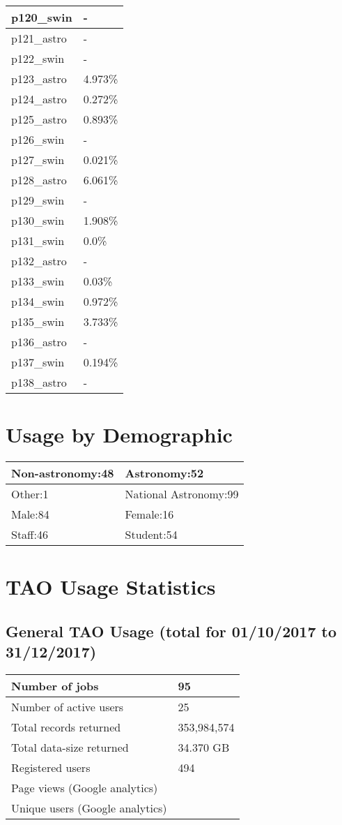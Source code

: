 \documentclass{article}%
\begin{document}
\begin{longtabu}{X[l] X[r]}
\hline%
p120\_swin&{-}\\%
\hline%
p121\_astro&{-}\\%
\hline%
p122\_swin&{-}\\%
\hline%
p123\_astro&4.973\%\\%
\hline%
p124\_astro&0.272\%\\%
\hline%
p125\_astro&0.893\%\\%
\hline%
p126\_swin&{-}\\%
\hline%
p127\_swin&0.021\%\\%
\hline%
p128\_astro&6.061\%\\%
\hline%
p129\_swin&{-}\\%
\hline%
p130\_swin&1.908\%\\%
\hline%
p131\_swin&0.0\%\\%
\hline%
p132\_astro&{-}\\%
\hline%
p133\_swin&0.03\%\\%
\hline%
p134\_swin&0.972\%\\%
\hline%
p135\_swin&3.733\%\\%
\hline%
p136\_astro&{-}\\%
\hline%
p137\_swin&0.194\%\\%
\hline%
p138\_astro&{-}\\%
\hline%
\end{longtabu}%
\section{Usage by Demographic}%

%
\begin{longtabu}{X[l] X[l]}%
Non{-}astronomy:48&Astronomy:52\\%
\hline%
Other:1&National Astronomy:99\\%
\hline%
Male:84&Female:16\\%
\hline%
Staff:46&Student:54\\%
\hline%
\end{longtabu}%
\newpage%
\section{TAO Usage Statistics}%

%
\subsection{General TAO Usage (total for 01/10/2017 to 31/12/2017)}%

%
\begin{longtabu}{X[l] X[l]}%
Number of jobs&95\\%
\hline%
Number of active users&25\\%
\hline%
Total records returned&353,984,574\\%
\hline%
Total data{-}size returned&34.370 GB\\%
\hline%
Registered users&494\\%
\hline%
Page views (Google analytics)&\\%
\hline%
Unique users (Google analytics)&\\%
\hline%
\end{longtabu}%
\end{document}
